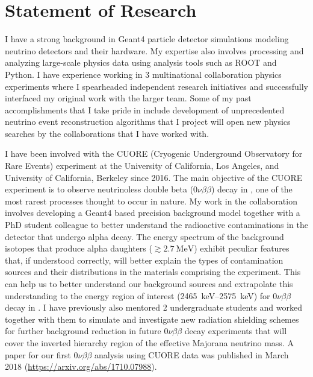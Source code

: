 \documentclass[11pt]{article} %
\begin{document}
\clearpage
\renewcommand\refname{Publications} %

\nocite{*} %
%



\clearpage
\section{Statement of Research}

I have a strong background in Geant4 particle detector simulations
modeling neutrino detectors and their hardware. My expertise also involves
processing and analyzing large-scale physics data using analysis tools such as
ROOT and Python. I have experience working in 3 multinational collaboration
physics experiments where I spearheaded independent research initiatives and
successfully interfaced my original work with the larger team. Some of my past
accomplishments that I take pride in include development of unprecedented
neutrino event reconstruction algorithms that I project will open new physics
searches by the collaborations that I have worked with.

I have been involved with the CUORE (Cryogenic Underground Observatory for Rare
Events) experiment at the University of California, Los Angeles, and University
of California, Berkeley since 2016. The main objective of the CUORE experiment
is to observe neutrinoless double beta ($0\nu\beta\beta$) decay in
, one of the most rarest processes thought to occur in nature. My
work in the collaboration involves developing a Geant4 based precision
background model together with a PhD student colleague to better understand the
radioactive contaminations in the detector that undergo alpha decay. The
energy spectrum of the background isotopes that produce alpha daughters
($\gtrsim \SI{2.7}{\mega\electronvolt}$) exhibit peculiar features that, if
understood correctly, will better explain the types of contamination sources
and their distributions in the materials comprising the experiment. This can
help us to better understand our background sources and extrapolate this
understanding to the energy region of interest
(\SIrange{2465}{2575}{\kilo\electronvolt}) for $0\nu\beta\beta$ decay in
. I have previously also mentored 2 undergraduate students and
worked together with them to simulate and investigate new radiation
shielding schemes for further background reduction in future $0\nu\beta\beta$
decay experiments that will cover the inverted hierarchy region of the
effective Majorana neutrino mass. A paper for our first $0\nu\beta\beta$
analysis using CUORE data was published in March 2018
(\href{https://arxiv.org/abs/1710.07988}{https://arxiv.org/abs/1710.07988}).
\end{document}

